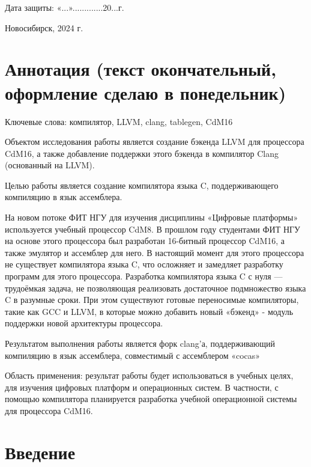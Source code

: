 \documentclass[a4paper,14pt]{extarticle}
\begin{document}
\begin{titlepage}
\begin{tabular*}{\textwidth}{l @{\hskip 4cm} l}
	\end{tabular*}
	\vfill
	\hfill
	\begin{minipage}{0.5\textwidth}
		Дата защиты: «...».............20...г.
	\end{minipage}
	
	\vfill
	
	\begin{center}
		Новосибирск, 2024 г.
	\end{center}
\end{titlepage}
	
	

\tableofcontents

\pagebreak
\section{Аннотация (текст окончательный, оформление сделаю в понедельник)}
Ключевые слова: компилятор, LLVM, clang, tablegen, CdM16

Объектом исследования работы является создание бэкенда LLVM для процессора CdM16, а также добавление поддержки этого бэкенда в компилятор Clang (основанный на LLVM).

Целью работы является создание компилятора языка C, поддерживающего компиляцию в язык ассемблера.

На новом потоке ФИТ НГУ для изучения дисциплины «Цифровые платформы» используется учебный процессор CdM8. В прошлом году студентами ФИТ НГУ на основе этого процессора был разработан 16-битный процессор CdM16, а также эмулятор и ассемблер для него. В настоящий момент для этого процессора не существует компилятора языка C, что осложняет и замедляет разработку программ для этого процессора. Разработка компилятора языка C с нуля — трудоёмкая задача, не позволяющая реализовать достаточное подмножество языка C в разумные сроки. При этом существуют готовые переносимые компиляторы, такие как GCC и LLVM, в которые можно добавить новый «бэкенд» - модуль поддержки новой архитектуры процессора.

Результатом выполнения работы является форк clang’а, поддерживающий компиляцию в язык ассемблера, совместимый с ассемблером «cocas»

Область применения: результат работы будет использоваться в учебных целях, для изучения цифровых платформ и операционных систем. В частности, с помощью компилятора планируется разработка учебной операционной системы для процессора CdM16.


\pagebreak
\section{Введение}
\end{document}
